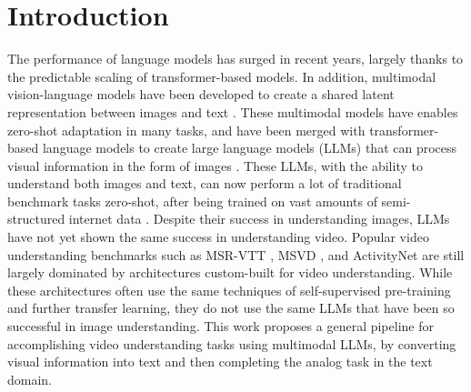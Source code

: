 \section{Introduction}

The performance of language models has surged in recent years, largely thanks to the predictable scaling of transformer-based models.
In addition, multimodal vision-language models have been developed to create a shared latent representation between images and text \cite{clip} \cite{coca} \cite{mmbt}.
These multimodal models have enables zero-shot adaptation in many tasks, and have been merged with transformer-based language models to create large language models (LLMs) that can process visual information in the form of images \cite{flamingo} \cite{llava} \cite{gpt4vision} \cite{gemini}.
These LLMs, with the ability to understand both images and text, can now perform a lot of traditional benchmark tasks zero-shot, after being trained on vast amounts of semi-structured internet data \cite{gpt4vision} \cite{clip} \cite{gemini} \cite{flamingo}.
Despite their success in understanding images, LLMs have not yet shown the same success in understanding video.
Popular video understanding benchmarks such as MSR-VTT \cite{msr-vtt}, MSVD \cite{msvd}, and ActivityNet \cite{activitynet} are still largely dominated by architectures custom-built for video understanding.
While these architectures often use the same techniques of self-supervised pre-training and further transfer learning, they do not use the same LLMs that have been so successful in image understanding.
This work proposes a general pipeline for accomplishing video understanding tasks using multimodal LLMs, by converting visual information into text and then completing the analog task in the text domain.

